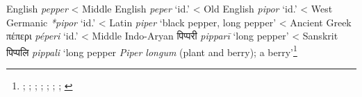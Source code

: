 \begin{etymology}\label{ety:pepper}
English \textit{pepper}
< Middle English \textit{peper} `id.'
< Old English \textit{pipor} `id.'
< West Germanic \textit{*pipor} `id.'
< Latin \textit{piper} `black pepper, long pepper'
< Ancient Greek {πέπερι} \textit{péperi} `id.'
< Middle Indo-Aryan {पिप्परी } \textit{pipparī} `long pepper'
< Sanskrit {पिप्पलि } \textit{pippali} `long pepper \textit{Piper longum} (plant and berry); a berry'\footnote{\textcite{oed}; \textcite{med}; \textcite{bosworth_anglo-saxon_2014}; \textcite{oe}; \textcite{lewis_latin_1879}; \textcite{liddell_greek-english_1940}; \textcite[599]{sheth_paia-sadda-mahannavo_1923}; \textcite[626]{monier-williams_sanskrit-english_1899}}
\end{etymology}